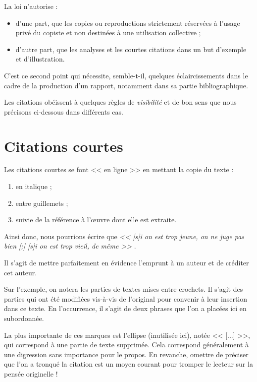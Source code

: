 \documentclass[11pt, french]{report-rd-info}
\begin{document}
La loi n'autorise :
\begin{itemize}
	\item d'une part, que les copies ou reproductions strictement réservées à l'usage privé du copiste et non destinées à une utilisation collective ;
	\item d'autre part, que les analyses et les courtes citations dans un but d'exemple et d'illustration.
\end{itemize}
C'est ce second point qui nécessite, semble-t-il, quelques éclaircissements dans le cadre de la production d'un rapport, notamment dans sa partie bibliographique.

Les citations obéissent à quelques règles de \emph{visibilité} et de bon sens que nous précisons ci-dessous dans différents cas.

\section{Citations courtes}

Les citations courtes se font << en ligne >> en mettant la copie du texte :
\begin{enumerate}
	\item en italique ;
	\item entre guillemets ;
	\item suivie de la référence à l'\oe uvre dont elle est extraite.
\end{enumerate}

Ainsi donc, nous pourrions écrire que \emph{<< [s]i on est trop jeune, on ne juge pas bien [;] [s]i on est trop vieil, de même >>} \cite{Pascal-1671}.

Il s'agit de mettre parfaitement en évidence l'emprunt à un auteur et de créditer cet auteur.

\bigskip

Sur l'exemple, on notera les parties de textes mises entre crochets. Il s'agit des parties qui ont été modifiées vis-à-vis de l'original pour convenir à leur insertion dans ce texte. En l'occurrence, il s'agit de deux phrases que l'on a placées ici en subordonnée.

La plus importante de ces marques est l'ellipse (inutilisée ici), notée << [...]  >>, qui correspond à une partie de texte supprimée. Cela correspond généralement à une digression sans importance pour le propos. En revanche, omettre de préciser que l'on a tronqué la citation est un moyen courant pour tromper le lecteur sur la pensée originelle !
\end{document}
